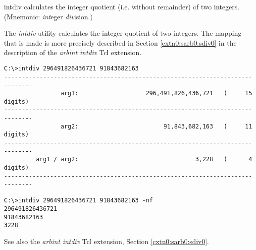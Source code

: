 \begin{dosutilcommandname}{intdiv}%
calculates the integer quotient (i.e. without remainder) of 
two integers.
(Mnemonic:  \emph{int}eger
\emph{div}ision.)
\end{dosutilcommandname}

\begin{dosutilcommandsynopsis}
\end{dosutilcommandsynopsis}

\begin{dosutilcommanddescription}
The \emph{intdiv} utility calculates the integer quotient
of two integers.  The mapping that is made is 
more precisely described in 
Section \cxtnzeroxrefhyphen{}\ref{cxtn0:sarb0:sdiv0} in the
description of the \emph{arbint intdiv} Tcl extension.
\end{dosutilcommanddescription}

\begin{dosutilcommandsampleinvocations}
\begin{scriptsize}
\begin{verbatim}
C:\>intdiv 296491826436721 91843682163
------------------------------------------------------------------------------
                arg1:                   296,491,826,436,721   (     15 digits)
------------------------------------------------------------------------------
                arg2:                        91,843,682,163   (     11 digits)
------------------------------------------------------------------------------
         arg1 / arg2:                                 3,228   (      4 digits)
------------------------------------------------------------------------------

C:\>intdiv 296491826436721 91843682163 -nf
296491826436721
91843682163
3228
\end{verbatim}
\end{scriptsize}
\end{dosutilcommandsampleinvocations}

\begin{dosutilcommandseealso}
See also the \emph{arbint intdiv} Tcl extension, 
Section \cxtnzeroxrefhyphen{}\ref{cxtn0:sarb0:sdiv0}.
\end{dosutilcommandseealso}


